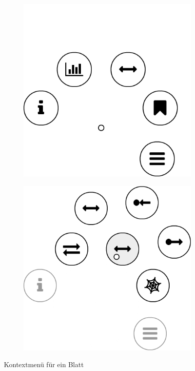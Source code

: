 \begin{figure}[htb]
  \centering
  \begin{subfigure}[b]{\fwidth}
    \centering
    \includegraphics[scale=0.45]{figures/leaf-contextmenu}
     \label{fig:leaf-contextmenu-initial}
  \end{subfigure}
  \hfill
  \begin{subfigure}[b]{\fwidth}
    \centering
  	\includegraphics[scale=0.45]{figures/leaf-contextmenu-connections}
  	 \label{fig:leaf-contextmenu-connections}
  \end{subfigure}
  \caption{Kontextmenü für ein Blatt} \label{fig:leaf-contextmenu}
\end{figure}

